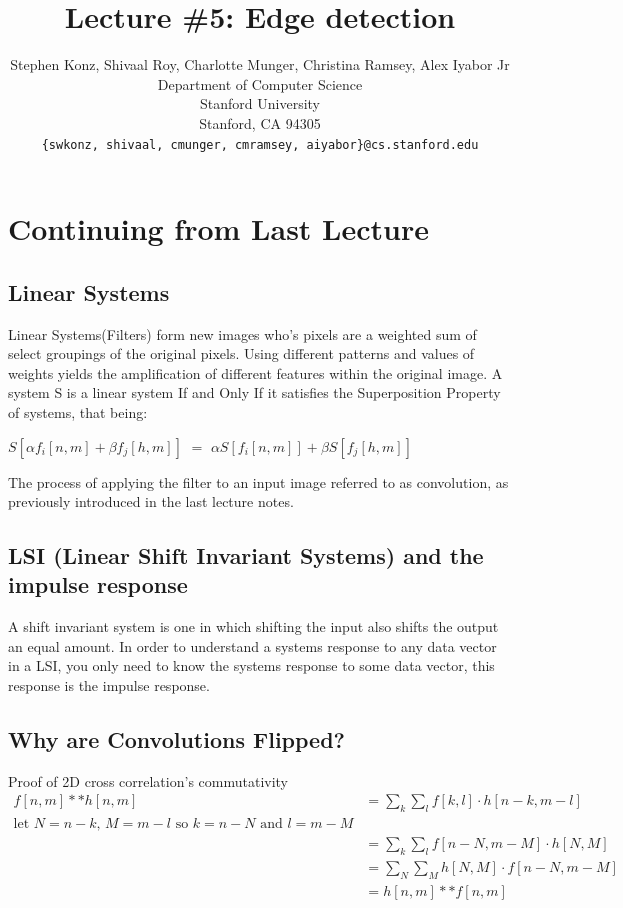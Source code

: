 \documentclass{article}
\title{Lecture \#5: Edge detection}
\author{
  Stephen Konz, Shivaal Roy, Charlotte Munger, Christina Ramsey, Alex Iyabor Jr \\
  Department of Computer Science\\
  Stanford University\\
  Stanford, CA 94305 \\
  \texttt{\{swkonz, shivaal, cmunger, cmramsey, aiyabor\}@cs.stanford.edu} \\
}
\begin{document}
\maketitle


\section{Continuing from Last Lecture}
\subsection{Linear Systems}
Linear Systems(Filters) form new images who's pixels are a weighted sum of select groupings of the original pixels. Using different patterns and values of weights yields the amplification of different features within the original image. A system S is a linear system If and Only If it satisfies the Superposition Property of systems, that being:
\begin{center}
$S[\alpha f_i[n,m] + \beta f_j[h,m]]$ $=$ $\alpha S[f_i[n,m]] + \beta S[f_j[h,m]]$
\end{center}

The process of applying the filter to an input image referred to as convolution, as previously introduced in the last lecture notes.

\subsection{LSI (Linear Shift Invariant Systems) and the impulse response}
A shift invariant system is one in which shifting the input also shifts the output an equal amount. In order to understand a systems response to any data vector in a LSI, you only need to know the systems response to some data vector, this response is the impulse response. 

\subsection{Why are Convolutions Flipped?}
Proof of 2D cross correlation's commutativity
\begin{align*}
f[n,m] * * h[n,m] &= \sum_{k}^{} \sum_{l}^{} f[k,l] \cdot h[n-k,m-l]\\
\text{let $N = n - k$, $M = m-l$ so $k = n - N$ and $l = m - M$} \\
&= \sum_{k}^{} \sum_{l}^{} f[n-N, m-M] \cdot h[N,M]\\
&= \sum_{N}^{} \sum_{M}^{} h[N,M] \cdot f[n-N, m-M]\\
&= h[n,m] * * f[n,m]
\end{align*}
\end{document}
